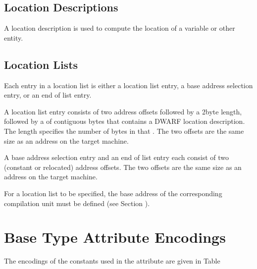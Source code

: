 \subsection{Location Descriptions}
\label{datarep:locationdescriptions}

A location description is used to compute the 
location of a variable or other entity.

\subsection{Location Lists}
\label{datarep:locationlists}

Each entry in a location list is either a location list entry,
a base address selection entry, or an end of list entry.

A location list entry consists of two address offsets followed
by a 2\dash byte length, followed by a  of contiguous bytes
that contains a DWARF location description. The length
specifies the number of bytes in that . The two offsets
are the same size as an address on the target machine.

A base address selection entry and an end of list entry each
consist of two (constant or relocated) address offsets. The two
offsets are the same size as an address on the target machine.

For a location list to be specified, the base address of
the corresponding compilation unit must be defined 
(see Section  ).

\section{Base Type Attribute Encodings}
\label{datarep:basetypeattributeencodings}

The encodings of the constants used in the 
attribute are given in 
Table 

